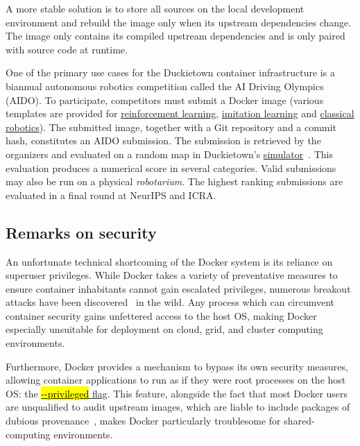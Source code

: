 \documentclass[12pt,initial,twoside,maitrise]{dms}
\newcommand{\inline}[1]{%
    \begingroup%
    \sethlcolor{slightgray}%
    \hl{\ttfamily\footnotesize #1}%
    \endgroup
}
\numberwithin{equation}{section}
\numberwithin{table}{chapter}
\numberwithin{figure}{chapter}
\begin{document}
A more stable solution is to store all sources on the local development environment and rebuild the image only when its upstream dependencies change. The image only contains its compiled upstream dependencies and is only paired with source code at runtime.

One of the primary use cases for the Duckietown container infrastructure is a biannual autonomous robotics competition called the AI Driving Olympics~\citep{aido2018} (AIDO). To participate, competitors must submit a Docker image (various templates are provided for \href{https://github.com/duckietown/challenge-aido_LF-baseline-RL-sim-pytorch}{reinforcement learning}, \href{https://github.com/duckietown/challenge-aido_LF-baseline-IL-logs-tensorflow}{imitation learning} and \href{https://github.com/duckietown/challenge-aido_LF-template-ros}{classical robotics}). The submitted image, together with a Git repository and a commit hash, constitutes an AIDO submission. The submission is retrieved by the organizers and evaluated on a random map in Duckietown's \href{https://github.com/duckietown/gym-duckietown}{simulator}~\citep{gym_duckietown}. This evaluation produces a numerical score in several categories. Valid submissions may also be run on a physical \textit{robotarium}. The highest ranking submissions are evaluated in a final round at NeurIPS and ICRA.

\subsection{Remarks on security}

An unfortunate technical shortcoming of the Docker system is its reliance on superuser privileges. While Docker takes a variety of preventative measures to ensure container inhabitants cannot gain escalated privileges, numerous breakout attacks have been discovered~\citep{martin2018docker} in the wild. Any process which can circumvent container security gains unfettered access to the host OS, making Docker especially unsuitable for deployment on cloud, grid, and cluster computing environments.

Furthermore, Docker provides a mechanism to bypass its own security measures, allowing container applications to run as if they were root processes on the host OS: the \href{https://docs.docker.com/engine/reference/run/#security-configuration}{\inline{-{}-privileged} flag}. This feature, alongside the fact that most Docker users are unqualified to audit upstream images, which are liable to include packages of dubious provenance~\citep{martin2018docker}, makes Docker particularly troublesome for shared-computing environments.
\end{document}
